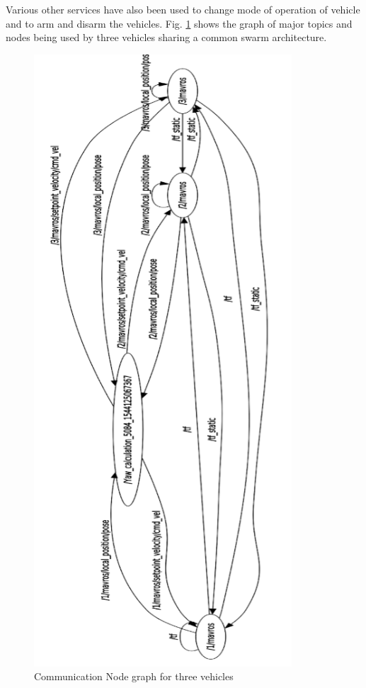 \begin{spacing}{2}
Various other services have also been used to change mode of operation of vehicle
and to arm and disarm the vehicles.
Fig. \ref{fig:rqtgraph} shows the graph of major topics and nodes being used
by three vehicles sharing a common swarm architecture.

\begin{figure}
    \centering
    \includegraphics[height = 9in]{image/rqt_plot.png}
    \caption{Communication Node graph for three vehicles}
    \label{fig:rqtgraph}
\end{figure}

\end{spacing}